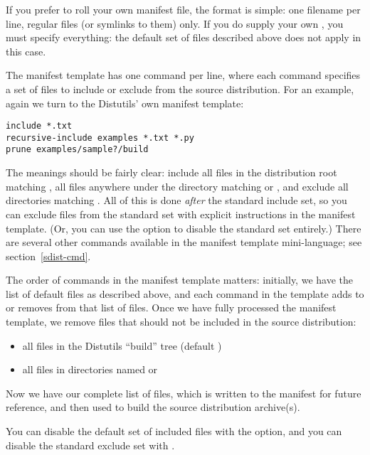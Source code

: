 \documentclass{howto}
\begin{document}
If you prefer to roll your own manifest file, the format is simple: one
filename per line, regular files (or symlinks to them) only.  If you do
supply your own , you must specify everything: the
default set of files described above does not apply in this case.

The manifest template has one command per line, where each command
specifies a set of files to include or exclude from the source
distribution.  For an example, again we turn to the Distutils' own
manifest template:
\begin{verbatim}
include *.txt
recursive-include examples *.txt *.py
prune examples/sample?/build
\end{verbatim}
The meanings should be fairly clear: include all files in the
distribution root matching , all files anywhere under the
 directory matching  or , and
exclude all directories matching .  All of
this is done \emph{after} the standard include set, so you can exclude
files from the standard set with explicit instructions in the manifest
template.  (Or, you can use the  option to
disable the standard set entirely.)  There are several other commands
available in the manifest template mini-language; see
section~\ref{sdist-cmd}.

The order of commands in the manifest template matters: initially, we
have the list of default files as described above, and each command in
the template adds to or removes from that list of files.  Once we have
fully processed the manifest template, we remove files that should not
be included in the source distribution:
\begin{itemize}
\item all files in the Distutils ``build'' tree (default )
\item all files in directories named  or 
\end{itemize}
Now we have our complete list of files, which is written to the manifest
for future reference, and then used to build the source distribution
archive(s).

You can disable the default set of included files with the
 option, and you can disable the standard
exclude set with .
\end{document}

